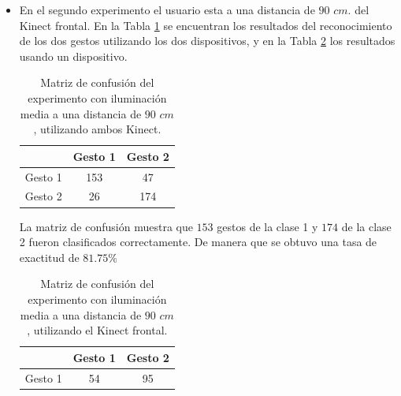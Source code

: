 \begin{itemize}
La matriz de confusión muestra que $136$ gestos de la clase 1 y $193$ de la clase 2 fueron clasificados correctamente. De manera que se obtuvo una tasa de exactitud de $82.25 \%$  

En este caso se observa una mejor exactitud cuando se utiliza solo un Kinect. 


\item En el segundo experimento el usuario esta a una distancia de $90$ $cm.$ del Kinect frontal. En la Tabla \ref{table:90LMK2} se encuentran los resultados del reconocimiento de los dos gestos utilizando los dos dispositivos, y en la Tabla \ref{table:90LMK1} los resultados usando un dispositivo.     


\begin{table}[h!] 
\begin{center} 
\caption{Matriz de confusión del experimento con iluminación media a una distancia de $90$ $cm$, utilizando ambos Kinect.} 
\label{table:90LMK2}
\begin{tabular}{ r || c | c |}  
        & Gesto 1 & Gesto 2 \\ \hline \hline  
Gesto 1 & 153     &  47     \\ \hline  
Gesto 2 & 26      & 174     \\   
\end{tabular}
\end{center} 
\end{table}

La matriz de confusión muestra que $153$ gestos de la clase 1 y $174$ de la clase 2 fueron clasificados correctamente. De manera que se obtuvo una tasa de exactitud de $81.75 \%$ 

\begin{table}[h!] 
\begin{center} 
\caption{Matriz de confusión del experimento con iluminación media a una distancia de $90$ $cm$, utilizando el Kinect frontal.} 
\label{table:90LMK1} 
\begin{tabular}{ r || c | c |} 
        & Gesto 1 & Gesto 2 \\ \hline \hline  
Gesto 1 &  54    &   95    \\ \hline  
\end{tabular}
\end{center} 
\end{table}  


\end{itemize}
